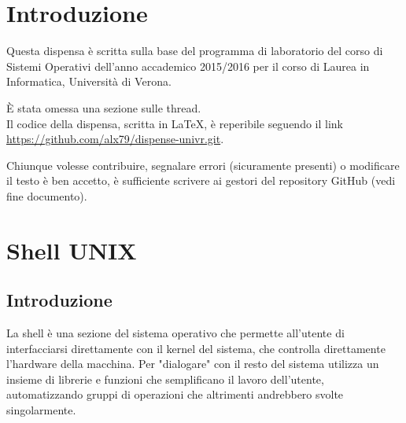 \documentclass[a4paper, 10pt]{article}
\begin{document}
		\begin{frontespizio}
	\end{frontespizio}
\hypersetup{hidelinks, colorlinks = true, linkcolor = black}
\newcommand{\mail}[1]{\href{mailto:#1}{\texttt{#1}}}
\pagestyle{fancy}
\newpage
{}
\tableofcontents
\newpage
{}

\section{Introduzione}
Questa dispensa è scritta sulla base del programma di laboratorio del corso di Sistemi Operativi dell'anno accademico 2015/2016 per il corso di Laurea in Informatica, Università di Verona.

È stata omessa una sezione sulle thread.\\

Il codice della dispensa, scritta in \LaTeX, è reperibile seguendo il link \url{https://github.com/alx79/dispense-univr.git}.

Chiunque volesse contribuire, segnalare errori (sicuramente presenti) o modificare il testo è ben accetto, è sufficiente scrivere ai gestori del repository GitHub (vedi fine documento).


\section{Shell UNIX}
\subsection{Introduzione}
La shell è una sezione del sistema operativo che permette all'utente di interfacciarsi direttamente con il kernel del sistema, che controlla direttamente l'hardware della macchina.
Per "dialogare" con il resto del sistema utilizza un insieme di librerie e funzioni che semplificano il lavoro dell'utente, automatizzando gruppi di operazioni che altrimenti andrebbero svolte singolarmente.
\end{document}
